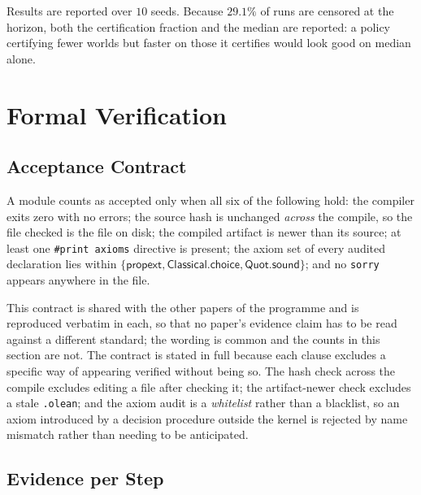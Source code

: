 \documentclass[conference]{IEEEtran}
\theoremstyle{definition}
\begin{document}
Results are reported over $10$ seeds. Because $29.1\%$ of runs are censored at the horizon,
both the certification fraction and the median are reported: a policy certifying fewer worlds
but faster on those it certifies would look good on median alone.

\section{Formal Verification}
\label{sec:verification}

\subsection{Acceptance Contract}

A module counts as accepted only when all six of the following hold: the compiler exits zero
with no errors; the source hash is unchanged \emph{across} the compile, so the file checked is
the file on disk; the compiled artifact is newer than its source; at least one
\texttt{\#print axioms} directive is present; the axiom set of every audited declaration lies
within $\{\textsf{propext},\textsf{Classical.choice},\textsf{Quot.sound}\}$; and no
\texttt{sorry} appears anywhere in the file.

This contract is shared with the other papers of the programme and is reproduced verbatim in
each, so that no paper's evidence claim has to be read against a different standard; the
wording is common and the counts in this section are not. The contract is stated in full
because each clause excludes a specific way of appearing verified without being so. The hash check across the compile excludes editing a file after
checking it; the artifact-newer check excludes a stale \texttt{.olean}; and the axiom audit is
a \emph{whitelist} rather than a blacklist, so an axiom introduced by a decision procedure
outside the kernel is rejected by name mismatch rather than needing to be anticipated.

\subsection{Evidence per Step}
\end{document}
